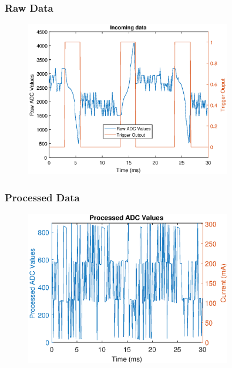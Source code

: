 \documentclass{beamer}
\begin{document}

	\begin{frame}\frametitle{Raw Data}

		\begin{figure}
			\centering
			\includegraphics[width=0.8\textwidth]{ac-raw-data.eps}
		\end{figure}

	\end{frame}





	\begin{frame}\frametitle{Processed Data}

		\begin{figure}
			\centering
			\includegraphics[width=0.8\textwidth]{../chapters/evaluation-chapters/hardware/ac/processed-ac-testbed-adc-data.eps}
		\end{figure}

	\end{frame}
\end{document}
